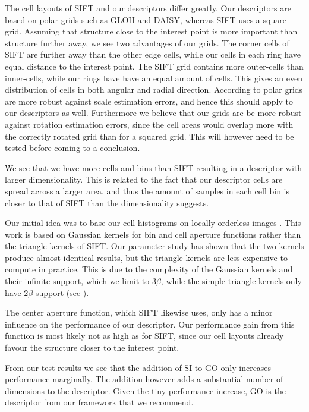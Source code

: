 \documentclass[thesis.tex]{subfiles}
\begin{document}
The cell layouts of SIFT and our descriptors differ greatly. Our descriptors are based on polar grids such as GLOH and DAISY, whereas SIFT uses a square grid. Assuming that structure close to the interest point is more important than structure further away, we see two advantages of our grids. The corner cells of SIFT are further away than the other edge cells, while our cells in each ring have equal distance to the interest point. The SIFT grid contains more outer-cells than inner-cells, while our rings have have an equal amount of cells. This gives an even distribution of cells in both angular and radial direction. According to \citet{cui2009scale} polar grids are more robust against scale estimation errors, and hence this should apply to our descriptors as well. Furthermore we believe that our grids are be more robust against rotation estimation errors, since the cell areas would overlap more with the correctly rotated grid than for a squared grid. This will however need to be tested before coming to a conclusion.

We see that we have more cells and bins than SIFT resulting in a descriptor with larger dimensionality. This is related to the fact that our descriptor cells are spread across a larger area, and thus the amount of samples in each cell bin is closer to that of SIFT than the dimensionality suggests.

Our initial idea was to base our cell histograms on locally orderless images \cite{koenderink1999structure}. This work is based on Gaussian kernels for bin and cell aperture functions rather than the triangle kernels of SIFT. Our parameter study has shown that the two kernels produce almost identical results, but the triangle kernels are less expensive to compute in practice. This is due to the complexity of the Gaussian kernels and their infinite support, which we limit to 3$\beta$, while the simple triangle kernels only have $2\beta$ support (see ).

The center aperture function, which SIFT likewise uses, only has a minor influence on the performance of our descriptor. Our performance gain from this function is most likely not as high as for SIFT, since our cell layouts already favour the structure closer to the interest point.

From our test results we see that the addition of SI to GO only increases performance marginally. The addition however adds a substantial number of dimensions to the descriptor.
Given the tiny performance increase, GO is the descriptor from our framework that we recommend.
\end{document}
